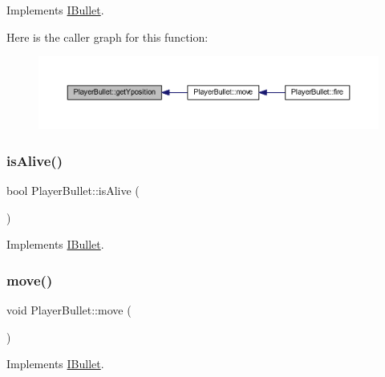 Implements \hyperlink{class_i_bullet_a36594de9a0c0ddd7083bca10ef5d8332}{I\+Bullet}.

Here is the caller graph for this function\+:
\nopagebreak
\begin{figure}[H]
\begin{center}
\leavevmode
\includegraphics[width=350pt]{class_player_bullet_a240cab35d5d909366986b8661ee65d3c_icgraph}
\end{center}
\end{figure}
\mbox{\label{class_player_bullet_ab4e6b1485e9a63ddc00effc7532a9b09}} 
\subsubsection{\texorpdfstring{is\+Alive()}{isAlive()}}
{\footnotesize\ttfamily bool Player\+Bullet\+::is\+Alive (\begin{DoxyParamCaption}{ }\end{DoxyParamCaption})\hspace{0.3cm}{\ttfamily [virtual]}}



Implements \hyperlink{class_i_bullet_ac1252496738126ec94a97512011b9112}{I\+Bullet}.

\mbox{\label{class_player_bullet_a8469319697d70e04399d8aaac3902c80}} 
\subsubsection{\texorpdfstring{move()}{move()}}
{\footnotesize\ttfamily void Player\+Bullet\+::move (\begin{DoxyParamCaption}{ }\end{DoxyParamCaption})\hspace{0.3cm}{\ttfamily [virtual]}}



Implements \hyperlink{class_i_bullet_a0884074f0bc793fb5a52ac33842622fd}{I\+Bullet}.


